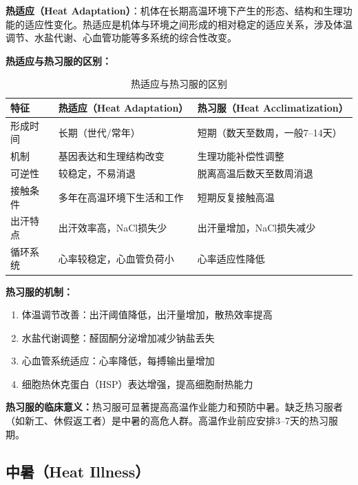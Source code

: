 \begin{defbox}
\textbf{热适应（Heat Adaptation）}：机体在长期高温环境下产生的形态、结构和生理功能的适应性变化。热适应是机体与环境之间形成的相对稳定的适应关系，涉及体温调节、水盐代谢、心血管功能等多系统的综合性改变。

\textbf{热适应与热习服的区别：}
\begin{table}[H]
\centering
\caption{热适应与热习服的区别}
\begin{tabularx}{\textwidth}{lXX}
\hline
\textbf{特征} & \textbf{热适应（Heat Adaptation）} & \textbf{热习服（Heat Acclimatization）} \\
\hline
形成时间 & 长期（世代/常年） & 短期（数天至数周，一般7--14天）\\
机制 & 基因表达和生理结构改变 & 生理功能补偿性调整 \\
可逆性 & 较稳定，不易消退 & 脱离高温后数天至数周消退 \\
接触条件 & 多年在高温环境下生活和工作 & 短期反复接触高温 \\
出汗特点 & 出汗效率高，NaCl损失少 & 出汗量增加，NaCl损失减少 \\
循环系统 & 心率较稳定，心血管负荷小 & 心率适应性降低 \\
\hline
\end{tabularx}
\end{table}

\textbf{热习服的机制：}
\begin{enumerate}[leftmargin=*]
    \item 体温调节改善：出汗阈值降低，出汗量增加，散热效率提高
    \item 水盐代谢调整：醛固酮分泌增加减少钠盐丢失
    \item 心血管系统适应：心率降低，每搏输出量增加
    \item 细胞热休克蛋白（HSP）表达增强，提高细胞耐热能力
\end{enumerate}

\textbf{热习服的临床意义：}热习服可显著提高高温作业能力和预防中暑。缺乏热习服者（如新工、休假返工者）是中暑的高危人群。高温作业前应安排3--7天的热习服期。
\end{defbox}

\subsection{中暑（Heat Illness）}

